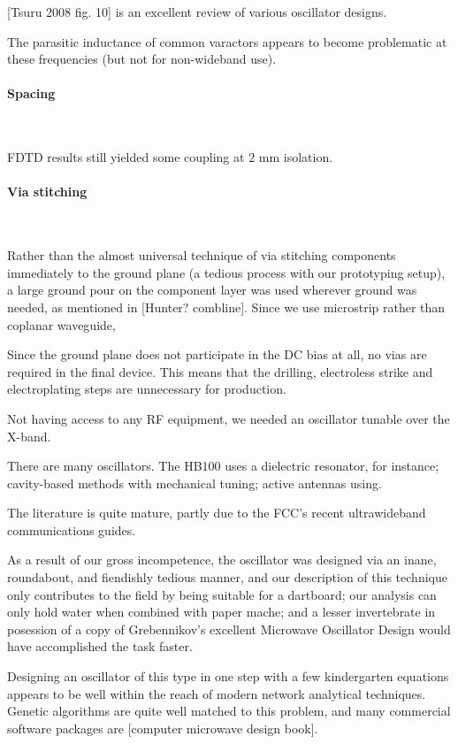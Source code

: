 \documentclass[paper.tex]{subfiles}
\begin{document}
[Tsuru 2008 fig. 10] is an excellent review of various oscillator designs.

The parasitic inductance of common varactors appears to become problematic at these frequencies (but not for non-wideband use).

\paragraph{\textbf{Spacing}}\

FDTD results still yielded some coupling at 2 mm isolation.

\paragraph{\textbf{Via stitching}}\

Rather than the almost universal technique of via stitching components immediately to the ground plane (a tedious process with our prototyping setup), a large ground pour on the component layer was used wherever ground was needed, as mentioned in [Hunter? combline]. Since we use microstrip rather than coplanar waveguide, 

Since the ground plane does not participate in the DC bias at all, no vias are required in the final device. This means that the drilling, electroless strike and electroplating steps are unnecessary for production.



Not having access to any RF equipment, we needed an oscillator tunable over the X-band.

There are many oscillators. The HB100 uses a dielectric resonator, for instance; cavity-based methods with mechanical tuning; active antennas using. 


The literature is quite mature, partly due to the FCC's recent ultrawideband communications guides.

As a result of our gross incompetence, the oscillator was designed via an inane, roundabout, and fiendishly tedious manner, and our description of this technique only contributes to the field by being suitable for a dartboard; our analysis can only hold water when combined with paper mache; and a lesser invertebrate in posession of a copy of Grebennikov's excellent Microwave Oscillator Design would have accomplished the task faster.


Designing an oscillator of this type in one step with a few kindergarten equations appears to be well within the reach of modern network analytical techniques. Genetic algorithms are quite well matched to this problem, and many commercial software packages are  [computer microwave design book]. 
\end{document}
